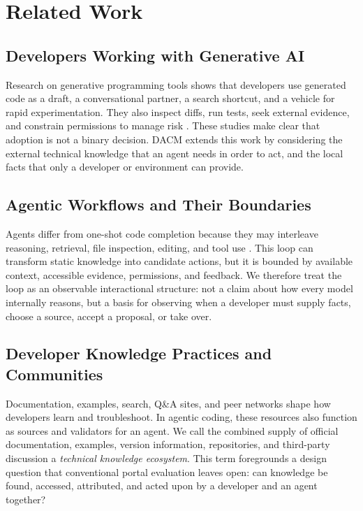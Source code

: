 \documentclass[manuscript,review,anonymous]{acmart}
\begin{document}
\section{Related Work}

\subsection{Developers Working with Generative AI}

Research on generative programming tools shows that developers use generated code as a draft, a conversational partner, a search shortcut, and a vehicle for rapid experimentation. They also inspect diffs, run tests, seek external evidence, and constrain permissions to manage risk \cite{barke2023grounded,vaithilingam2022expectation}. These studies make clear that adoption is not a binary decision. DACM extends this work by considering the external technical knowledge that an agent needs in order to act, and the local facts that only a developer or environment can provide.

\subsection{Agentic Workflows and Their Boundaries}

Agents differ from one-shot code completion because they may interleave reasoning, retrieval, file inspection, editing, and tool use \cite{yao2023react,yang2024sweagent}. This loop can transform static knowledge into candidate actions, but it is bounded by available context, accessible evidence, permissions, and feedback. We therefore treat the loop as an observable interactional structure: not a claim about how every model internally reasons, but a basis for observing when a developer must supply facts, choose a source, accept a proposal, or take over.

\subsection{Developer Knowledge Practices and Communities}

Documentation, examples, search, Q\&A sites, and peer networks shape how developers learn and troubleshoot. In agentic coding, these resources also function as sources and validators for an agent. We call the combined supply of official documentation, examples, version information, repositories, and third-party discussion a \emph{technical knowledge ecosystem}. This term foregrounds a design question that conventional portal evaluation leaves open: can knowledge be found, accessed, attributed, and acted upon by a developer and an agent together?
\end{document}
